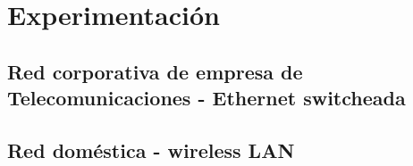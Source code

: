 \section{Experimentación}


\newpage


\newpage

\subsection{Red corporativa de empresa de Telecomunicaciones - Ethernet switcheada}

\newpage

\subsection{Red doméstica - wireless LAN}

\newpage
